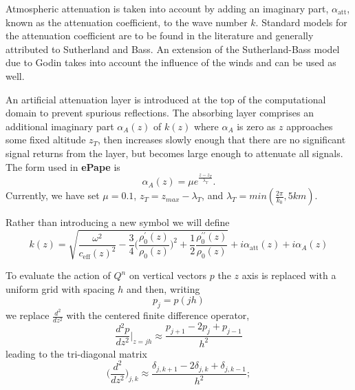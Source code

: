 Atmospheric attenuation is taken into account by adding an imaginary part, $\alpha_{\text{att}}$, known as the attenuation coefficient, to the wave number $k$. Standard models for the attenuation coefficient are to be found in the literature and generally attributed to Sutherland and Bass\cite{bass_suth}. An extension of the Sutherland-Bass model due to Godin takes into account the influence of the winds and can be used as well\cite{Godin_attenuation}. 

An artificial attenuation layer is introduced at the top of the computational domain to prevent spurious reflections. The absorbing layer comprises an additional imaginary part $\alpha_A(z)$ of $k(z)$ where $\alpha_A$ is zero as $z$ approaches some fixed altitude $z_T$, then increases slowly enough that there are no significant signal returns from the layer, but becomes large enough to attenuate all signals. The form used in {\bf ePape} is
\begin{equation}
\alpha_A(z)=\mu e^{\frac{z-z_T}{\lambda_T}}.
\label{eq:artificial_attenuation}\end{equation}
Currently, we have set $\mu=0.1$, $z_T = z_{max}-\lambda_T$, and $\lambda_T=min(\frac{2\pi}{k_0},5 km)$.

Rather than introducing a new symbol we will define
\begin{equation}
k(z)
=
\sqrt{\frac{\omega^2}{c_{\text{eff}}(z)^2}-\frac{3}{4}\big(\frac{\rho_0^\prime(z)}{\rho_0(z)}\big)^2
+
\frac{1}{2}\frac{\rho_0^{\prime\prime}(z)}{\rho_0(z)}}
+i\alpha_{\text{att}}(z)+i\alpha_A(z)
\label{eq:complex_k}\end{equation}

To evaluate the action of $Q^n$ on vertical vectors $p$ the $z$ axis is replaced with a uniform grid with spacing $h$ and then, writing
\[
p_j=p(jh)
\] 
we replace $\frac{d^2}{dz^2}$ with the centered finite difference operator, 
\[
\frac{d^2p}{dz^2}\big|_{z=jh}\approx \frac{p_{j+1}-2p_j+p_{j-1}}{h^2}
\]
leading to the tri-diagonal matrix
\[
\Big(\frac{d^2}{dz^2}\Big)_{j,k}\approx \frac{\delta_{j,k+1}-2\delta_{j,k}+\delta_{j,k-1}}{h^2};
\]

